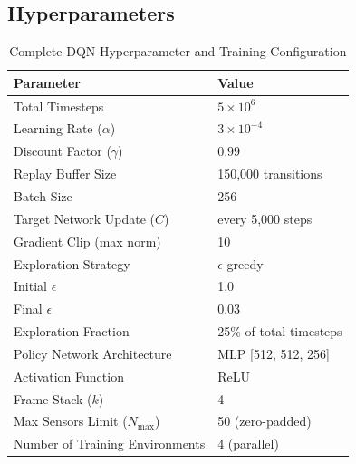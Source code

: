 \clearpage
\subsection{Hyperparameters}
\label{app:hyperparams}

\begin{table}[H]
    \centering
    \caption{Complete DQN Hyperparameter and Training Configuration}
    \label{tab:hyperparams_full}
    \begin{tabular}{ll}
        \toprule
        \textbf{Parameter}               & \textbf{Value}             \\
        \midrule
        Total Timesteps                  & $5 \times 10^6$            \\
        Learning Rate ($\alpha$)         & $3 \times 10^{-4}$         \\
        Discount Factor ($\gamma$)       & $0.99$                     \\
        Replay Buffer Size               & 150{,}000 transitions      \\
        Batch Size                       & 256                        \\
        Target Network Update ($C$)      & every 5{,}000 steps        \\
        Gradient Clip (max norm)         & 10                         \\
        Exploration Strategy             & $\epsilon$-greedy          \\
        Initial $\epsilon$               & 1.0                        \\
        Final $\epsilon$                 & 0.03                       \\
        Exploration Fraction             & 25\% of total timesteps    \\
        Policy Network Architecture      & MLP [512, 512, 256]        \\
        Activation Function              & ReLU                       \\
        Frame Stack ($k$)                & 4                          \\
        Max Sensors Limit ($N_{\max}$)   & 50 (zero-padded)           \\
        Number of Training Environments  & 4 (parallel)               \\
        \bottomrule
    \end{tabular}
\end{table}

